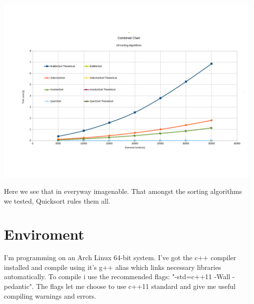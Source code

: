 \documentclass[11pt]{article}
\begin{document}
\begin{center}
\includegraphics[scale=0.5]{Image}
\end{center}




Here we see that in everyway imagenable. That amongst the sorting algorithms we tested, Quicksort rules them all.

\section{Enviroment}
I'm programming on an Arch Linux 64-bit system. I've got the c++ compiler installed and compile using it's g++ alias which links necessary libraries automatically. To compile i use the recommended flags: "-std=c++11 -Wall -pedantic". The flags let me choose to use c++11 standard and give me useful compiling warnings and errors. 
\flushright{\today}
\end{document}
